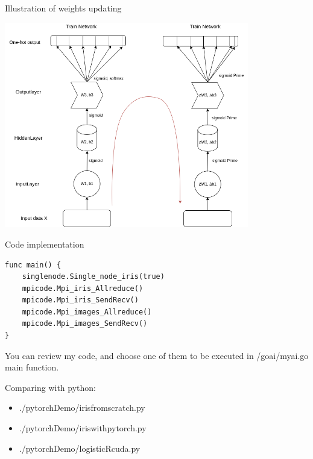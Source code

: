 \documentclass[presentation]{beamer}
\begin{document}
\begin{frame}[label={sec:org9ec4f90}]{Illustration of weights updating}
\begin{center}
\includegraphics[width=0.8\textwidth]{./png/NeuralNetwork.png}
\end{center}
\end{frame}

\begin{frame}[label={sec:org891179f},fragile]{Code implementation}
 \begin{verbatim}
func main() {
	singlenode.Single_node_iris(true)
	mpicode.Mpi_iris_Allreduce()
	mpicode.Mpi_iris_SendRecv()
	mpicode.Mpi_images_Allreduce()
	mpicode.Mpi_images_SendRecv()
}
\end{verbatim}

You can review my code, and choose one of them to be executed in /goai/myai.go main function.

Comparing with python:

\begin{itemize}
\item ./pytorchDemo/irisfromscratch.py
\item ./pytorchDemo/iriswithpytorch.py
\item ./pytorchDemo/logisticRcuda.py
\end{itemize}
\end{frame}
\end{document}
